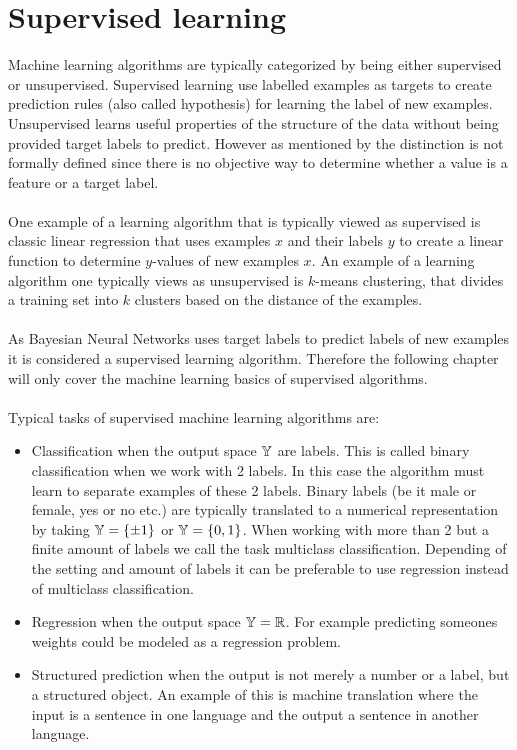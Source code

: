 \section{Supervised learning}
Machine learning algorithms are typically categorized by being either supervised or unsupervised. Supervised learning use labelled examples as targets to create prediction rules (also called hypothesis) for learning the label of new examples. Unsupervised learns useful properties of the structure of the data without being provided target labels to predict. However as mentioned by \cite{Goodfellow-et-al-2016} the distinction is not formally defined since there is no objective way to determine whether a value is a feature or a target label.\\
\\
One example of a learning algorithm that is typically viewed as supervised is classic linear regression that uses examples $x$ and their labels $y$ to create a linear function to determine $y$-values of new examples $x$. An example of a learning algorithm one typically views as unsupervised is $k$-means clustering, that divides a training set into $k$ clusters based on the distance of the examples. \\
\\
As Bayesian Neural Networks uses target labels to predict labels of new examples it is considered a supervised learning algorithm. Therefore the following chapter will only cover the machine learning basics of supervised algorithms. \\
\\
Typical tasks of supervised machine learning algorithms are:
\begin{itemize}
    \item Classification when the output space $\mathbb{Y}$ are labels. This is called binary classification when we work with 2 labels. In this case the algorithm must learn to separate examples of these 2 labels. Binary labels (be it male or female, yes or no etc.) are typically translated to a numerical representation by taking $\mathbb{Y} = \{ \pm 1 \}$ or $\mathbb{Y} = \{0,1 \}$. When working with more than 2 but a finite amount of labels we call the task multiclass classification. Depending of the setting and amount of labels it can be preferable to use regression instead of multiclass classification.
    \item Regression when the output space $\mathbb{Y} = \mathbb{R}$. For example predicting someones weights could be modeled as a regression problem.
    \item Structured prediction when the output is not merely a number or a label, but a structured object. An example of this is machine translation where the input is a sentence in one language and the output a sentence in another language. 
\end{itemize}


